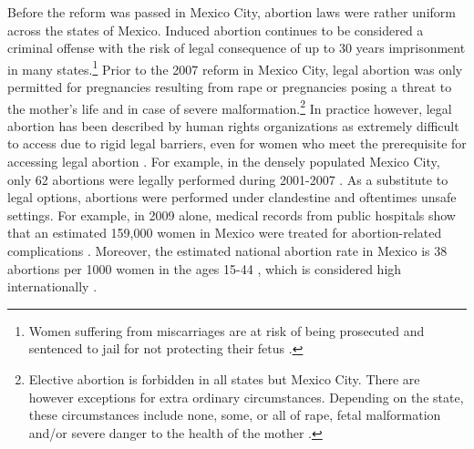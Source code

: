 \documentclass[a4paper, 11pt]{article}
\begin{document}
\begin{spacing}{2}
Before the reform was passed in Mexico City, abortion laws were rather uniform across the states of Mexico. Induced abortion continues to be considered a criminal offense with the risk of legal consequence of up to 30 years imprisonment in many states.\footnote{Women suffering from miscarriages are at risk of being prosecuted and sentenced to jail for not protecting their fetus \citep{GIRE2009}.} Prior to the 2007 reform in Mexico City, legal abortion was only permitted for pregnancies resulting from rape or pregnancies posing a threat to the mother's life and in case of severe malformation.\footnote{Elective abortion is forbidden in all states but Mexico City. There are however exceptions for extra ordinary circumstances. Depending on the state, these circumstances include none, some, or all of rape, fetal malformation and/or severe danger to the health of the mother \citep{GIRE2009}.} In practice however, legal abortion has been described by human rights organizations as extremely difficult to access due to rigid legal barriers, even for women who meet the prerequisite for accessing legal abortion \citep{GIRE2009}. For example, in the densely populated Mexico City, only 62 abortions were legally performed during 2001-2007 \citep{Becker}. As a substitute to legal options, abortions were performed under clandestine and oftentimes unsafe settings. For example, in 2009 alone, medical records from public hospitals show that an estimated 159,000 women in Mexico were treated for abortion-related complications \citep{GIRE2009}. Moreover, the estimated national abortion rate in Mexico is 38 abortions per 1000 women in the ages 15-44 \citep{GIRE2009}, which is considered high internationally \citep{Becker}. 


\end{spacing}
\end{document}
